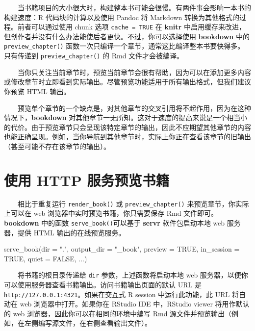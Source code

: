 \documentclass[
  12pt,
]{krantz}
\newenvironment{Shaded}{\begin{snugshade}}{\end{snugshade}}
\newcommand{\AttributeTok}[1]{\textcolor[rgb]{0.77,0.63,0.00}{#1}}
\newcommand{\ConstantTok}[1]{\textcolor[rgb]{0.00,0.00,0.00}{#1}}
\newcommand{\FunctionTok}[1]{\textcolor[rgb]{0.00,0.00,0.00}{#1}}
\newcommand{\NormalTok}[1]{#1}
\newcommand{\StringTok}[1]{\textcolor[rgb]{0.31,0.60,0.02}{#1}}
\theoremstyle{definition}
\theoremstyle{definition}
\theoremstyle{definition}
\theoremstyle{definition}
\theoremstyle{remark}
\begin{document}
  当书籍项目的大小很大时，构建整本书可能会很慢。有两件事会影响一本书的构建速度：R 代码块的计算以及使用 Pandoc 将 Markdown 转换为其他格式的过程。前者可以通过使用 chunk 选项 \texttt{cache\ =\ TRUE} 在 \textbf{knitr} 中启用缓存来改进，但创作者并没有什么办法能使后者更快。不过，你可以选择使用 \textbf{bookdown} 中的 \texttt{preview\_chapter()} 函数一次只编译一个章节，通常这比编译整本书要快得多。只有传递到 \texttt{preview\_chapter()} 的 Rmd 文件才会被编译。

  当你只关注当前章节时，预览当前章节会很有帮助，因为可以在添加更多内容或修改章节时立即看到实际输出。尽管预览功能适用于所有输出格式，但我们建议你预览 HTML 输出。

  预览单个章节的一个缺点是，对其他章节的交叉引用将不起作用，因为在这种情况下，\textbf{bookdown} 对其他章节一无所知。这对于速度的提高来说是一个相当小的代价。由于预览章节只会呈现该特定章节的输出，因此不应期望其他章节的内容也能正确呈现。例如，当你导航到其他章节时，实际上你正在查看该章节的旧输出（甚至可能不存在该章节的输出）。

\hypertarget{ux4f7fux7528-http-ux670dux52a1ux9884ux89c8ux4e66ux7c4d}{%
\section{使用 HTTP 服务预览书籍}\label{ux4f7fux7528-http-ux670dux52a1ux9884ux89c8ux4e66ux7c4d}}

  相比于重复运行 \texttt{render\_book()} 或 \texttt{preview\_chapter()} 来预览章节，你实际上可以在 web 浏览器中实时预览书籍，你只需要保存 Rmd 文件即可。\textbf{bookdown} 中的函数 \texttt{serve\_book()}可以基于 \textbf{servr} 软件包\citep{R-servr}启动本地 web 服务器，提供 HTML 输出的在线预览服务。

\begin{Shaded}
\begin{Highlighting}[]
\FunctionTok{serve\_book}\NormalTok{(}\AttributeTok{dir =} \StringTok{"."}\NormalTok{, }\AttributeTok{output\_dir =} \StringTok{"\_book"}\NormalTok{,}
  \AttributeTok{preview =} \ConstantTok{TRUE}\NormalTok{, }\AttributeTok{in\_session =} \ConstantTok{TRUE}\NormalTok{, }\AttributeTok{quiet =} \ConstantTok{FALSE}\NormalTok{,}
\NormalTok{  ...)}
\end{Highlighting}
\end{Shaded}

  将书籍的根目录传递给 \texttt{dir} 参数，上述函数将启动本地 web 服务器，以便你可以使用服务器查看书籍输出。访问书籍输出页面的默认 URL 是 \texttt{http://127.0.0.1:4321}。如果在交互式 R session 中运行此功能，此 URL 将自动在 web 浏览器中打开。如果你在 RStudio IDE 中，RStudio viewer 将用作默认的 web 浏览器，因此你可以在相同的环境中编写 Rmd 源文件并预览输出（例如，在左侧编写源文件，在右侧查看输出文件）。
\end{document}

